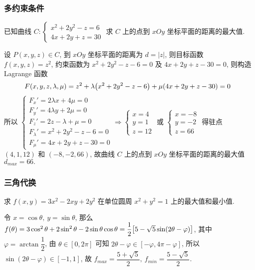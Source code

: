 \subsubsection{多约束条件}

\begin{example}[2019 数一]
    已知曲线 $C:\begin{cases}
        x^2+2y^2-z=6\\
        4x+2y+z=30
    \end{cases}$ 求 $C$ 上的点到 $xOy$ 坐标平面的距离的最大值.
\end{example}
\begin{solution}
    设 $P(x,y,z)\in C$, 到 $xOy$ 坐标平面的距离为 $d=|z|$, 则目标函数 $f(x,y,z)=z^2$, 约束函数为 $x^2+2y^2-z-6=0$ 及 $4x+2y+z-30=0$, 则构造 Lagrange 函数
    $$F(x,y,z,\lambda,\mu)=z^2+\lambda\qty(x^2+2y^2-z-6)+\mu\qty(4x+2y+z-30)=0$$
    所以 $\begin{cases}
        F_x'=2\lambda x+4\mu=0\\
        F_y'=4\lambda y+2\mu=0\\
        F_z'=2z-\lambda+\mu=0\\
        F_\lambda'=x^2+2y^2-z-6=0\\
        F_\mu'=4x+2y+z-30=0
    \end{cases}\Rightarrow \begin{cases}
        x=4\\
        y=1\\
        z=12
    \end{cases}\text{ 或 }\begin{cases}
        x=-8\\
        y=-2\\
        z=66
    \end{cases}$ 得驻点 $(4,1,12)$ 和 $(-8,-2,66)$, 故曲线 $C$ 上的点到 $xOy$ 坐标平面的距离的最大值 $d_{max}=66.$
\end{solution}

\subsubsection{三角代换}

\begin{example}
    求 $f(x,y)=3x^2-2xy+2y^2$ 在单位圆周 $x^2+y^2=1$ 上的最大值和最小值.
\end{example}
\begin{solution}
    令 $x=\cos\theta,~y=\sin\theta$, 那么 $f(\theta)=3\cos^2\theta+2\sin^2\theta-2\sin \theta\cos\theta=\dfrac{1}{2}\qty[5-\sqrt{5}\sin(2\theta-\varphi)]$, 其中 $\varphi=\arctan\dfrac{1}{2}$, 
    由 $\theta\in[0,2\pi]$ 可知 $2\theta-\varphi\in[-\varphi,4\pi-\varphi]$, 所以 $\sin(2\theta-\varphi)\in[-1,1]$, 故 $f_{max}=\dfrac{5+\sqrt{5}}{2},~f_{min}=\dfrac{5-\sqrt{5}}{2}.$
\end{solution}

